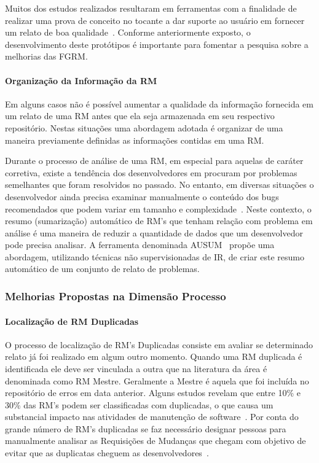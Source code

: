 Muitos dos estudos realizados resultaram em ferramentas com a finalidade de
realizar uma prova de conceito no tocante a dar suporte ao usuário em fornecer
um relato de boa qualidade~\cite{Tu:2014:MQI:2677832.2677844, Bettenburg2008a,
	Wu2011a,White:2015:GRR:2820282.2820291,moran2015auto}. Conforme
anteriormente exposto, o desenvolvimento deste protótipos é importante para
fomentar a pesquisa sobre a melhorias das FGRM\@.

\paragraph{Organização da Informação da RM}

Em alguns casos não é possível aumentar a qualidade da informação fornecida
em um relato de uma RM antes que ela seja armazenada em seu respectivo
repositório.  Nestas situações uma abordagem adotada é organizar de uma
maneira previamente definidas as informações contidas em uma RM\@.

Durante o processo de análise de uma RM, em especial para aquelas de caráter
corretiva, existe a tendência dos desenvolvedores em procuram por problemas
semelhantes que foram resolvidos no passado. No entanto, em diversas situações o
desenvolvedor ainda precisa examinar manualmente o conteúdo dos bugs
recomendados que podem variar em tamanho e complexidade~\cite{mani2012ausum}.
Neste contexto, o resumo (sumarização) automático de RM's que tenham relação com
problema em análise é uma maneira de reduzir a quantidade de dados que um
desenvolvedor pode precisa analisar. A ferramenta denominada
AUSUM~\cite{mani2012ausum} propõe uma abordagem, utilizando técnicas não
supervisionadas de IR, de criar este resumo automático de um conjunto de relato
de problemas.

\subsubsection{Melhorias Propostas na Dimensão Processo}
\label{ssub:melhorias_dim_processo}

\paragraph{Localização de RM Duplicadas} O processo de localização de RM's
Duplicadas consiste em avaliar se determinado relato já foi realizado em algum
outro momento. Quando uma RM duplicada é identificada ele deve ser vinculada a
outra que na literatura da área é denominada como RM Mestre. Geralmente a Mestre
é aquela que foi incluída no repositório de erros em data anterior. Alguns
estudos revelam que entre 10\% e 30\% das RM's podem ser classificadas com
duplicadas, o que causa um substancial impacto nas atividades de manutenção de
software~\cite{anvik2005coping,cavalcanti2013bug,Runeson:2007:DDD:1248820.1248882}.
Por conta do grande número de RM's duplicadas se faz necessário designar pessoas
para manualmente analisar as Requisições de Mudanças que chegam com objetivo de
evitar que as duplicatas cheguem as desenvolvedores~\cite{anvik2005coping}.

